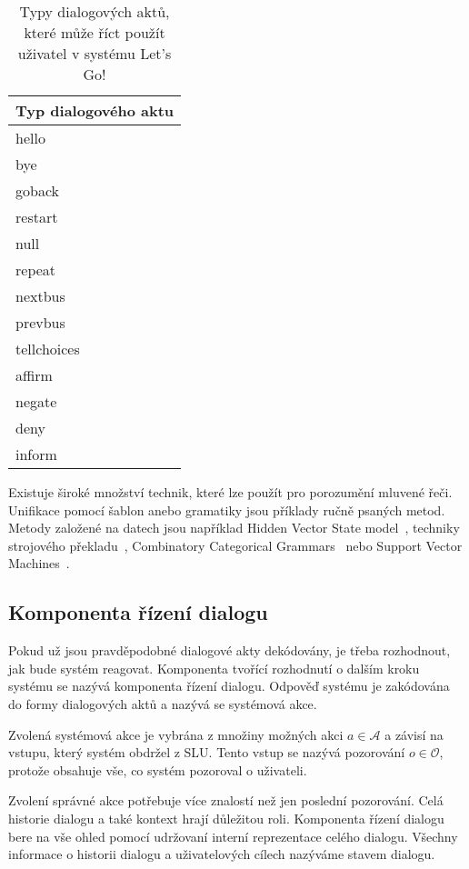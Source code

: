 \begin{table}
\begin{center}
\begin{tabular}{|l|}
\hline
Typ dialogového aktu \\
\hline
\hline
hello \\
\hline
bye \\
\hline
goback \\
\hline
restart \\
\hline
null \\
\hline
repeat \\
\hline
nextbus \\
\hline
prevbus \\
\hline
tellchoices \\
\hline
affirm \\
\hline
negate \\
\hline
deny \\
\hline
inform \\
\hline
\end{tabular}
\caption{Typy dialogových aktů, které může říct použít uživatel v systému Let's Go!}
\label{tab:dstcdat}
\end{center}
\end{table}

Existuje široké množství technik, které lze použít pro porozumění mluvené řeči.
Unifikace pomocí šablon anebo gramatiky jsou příklady ručně psaných metod.
Metody založené na datech jsou například Hidden Vector State model~\cite{he2005semantic}, techniky strojového překladu~\cite{wong2007learning}, Combinatory Categorical Grammars~\cite{zettlemoyer2007online} nebo Support Vector Machines~\cite{mairesse2009spoken}.

\subsection{Komponenta řízení dialogu}

Pokud už jsou pravděpodobné dialogové akty dekódovány, je třeba rozhodnout, jak bude systém reagovat.
Komponenta tvořící rozhodnutí o dalším kroku systému se nazývá komponenta řízení dialogu.
Odpověď systému je zakódována do formy dialogových aktů a nazývá se systémová akce.

Zvolená systémová akce je vybrána z množiny možných akci $a \in \mathcal{A}$ a závisí na vstupu, který systém obdržel z SLU.
Tento vstup se nazývá pozorování $o \in \mathcal{O}$, protože obsahuje vše, co systém pozoroval o uživateli.

Zvolení správné akce potřebuje více znalostí než jen poslední pozorování.
Celá historie dialogu a také kontext hrají důležitou roli.
Komponenta řízení dialogu bere na vše ohled pomocí udržovaní interní reprezentace celého dialogu.
Všechny informace o historii dialogu a uživatelových cílech nazýváme stavem dialogu.

